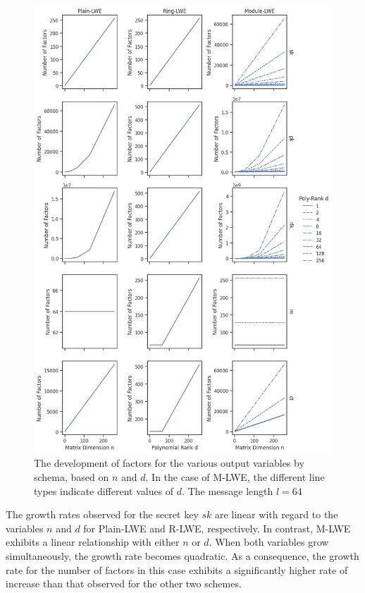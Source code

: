 \begin{figure}[ht!]
  \centering
  \includegraphics[scale=0.55]{images/OutputFactors.png}
  \caption[Output Variable Factors by Scheme]{The development of factors for the various output variables by schema, based on $n$ and $d$. In the case of M-LWE, the different line types indicate different values of $d$. The message length $l=64$}
  \label{fig:OutputFactors}
\end{figure}

The growth rates observed for the secret key $sk$ are linear with regard to the variables $n$ and $d$ for Plain-LWE and R-LWE, respectively. In contrast, M-LWE exhibits a linear relationship with either $n$ or $d$. When both variables grow simultaneously, the growth rate becomes quadratic. As a consequence, the growth rate for the number of factors in this case exhibits a significantly higher rate of increase than that observed for the other two schemes.

